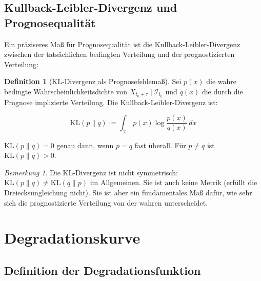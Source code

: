 \documentclass[12pt, a4paper, titlepage]{report}
\theoremstyle{definition}
\newtheorem{definition}[theorem]{Definition}
\theoremstyle{remark}
\newtheorem{remark}[theorem]{Bemerkung}
\newcommand{\KL}{\mathrm{KL}}
\begin{document}
\section{Kullback-Leibler-Divergenz und Prognosequalität}

Ein präziseres Maß für Prognosequalität ist die Kullback-Leibler-Divergenz zwischen der tatsächlichen bedingten Verteilung und der prognostizierten Verteilung:

\begin{definition}[KL-Divergenz als Prognosefehlemaß]
Sei $p(x)$ die wahre bedingte Wahrscheinlichkeitsdichte von $X_{t_0+\tau} \mid \mathcal{I}_{t_0}$ und $q(x)$ die durch die Prognose implizierte Verteilung. Die Kullback-Leibler-Divergenz ist:

\begin{equation}
\KL(p \parallel q) := \int_{\mathcal{X}} p(x) \log \frac{p(x)}{q(x)} \, dx
\label{eq:kl}
\end{equation}

$\KL(p \parallel q) = 0$ genau dann, wenn $p = q$ fast überall. Für $p \neq q$ ist $\KL(p \parallel q) > 0$.
\end{definition}

\begin{remark}
Die KL-Divergenz ist nicht symmetrisch: $\KL(p \parallel q) \neq \KL(q \parallel p)$ im Allgemeinen. Sie ist auch keine Metrik (erfüllt die Dreiecksungleichung nicht). Sie ist aber ein fundamentales Maß dafür, wie sehr sich die prognostizierte Verteilung von der wahren unterscheidet.
\end{remark}

\chapter{Degradationskurve}
\label{sec:degradation}

\section{Definition der Degradationsfunktion}
\end{document}
